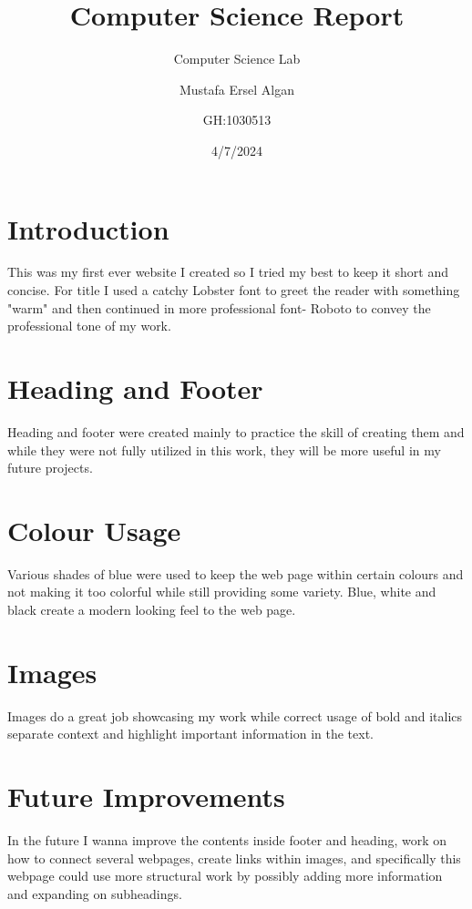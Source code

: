 \documentclass[twoside]{article}
\title{Computer Science Report}
\subtitle{Computer Science Lab}
\author{Mustafa Ersel Algan \and GH:1030513}
\date{4/7/2024}
\begin{document}
\maketitle{}

\section*{Introduction}
This was my first ever website I created so I tried my best to keep it short and concise. For title I used a catchy Lobster font to greet the reader with something "warm" and then continued in more professional font- Roboto to convey the professional tone of my work.

\section*{Heading and Footer}
Heading and footer were created mainly to practice the skill of creating them and while they were not fully utilized in this work, they will be more useful in my future projects.

\section*{Colour Usage}
Various shades of blue were used to keep the web page within certain colours and not making it too colorful while still providing some variety. Blue, white and black create a modern looking feel to the web page.

\section*{Images}
Images do a great job showcasing my work while correct usage of bold and italics separate context and highlight important information in the text.

\section*{Future Improvements}
In the future I wanna improve the contents inside footer and heading, work on how to connect several webpages, create links within images, and specifically this webpage could use more structural work by possibly adding more information and expanding on subheadings.
\end{document}
